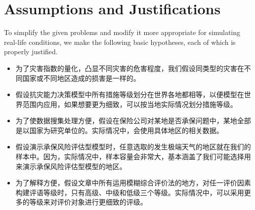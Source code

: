 \documentclass{mcmthesis}
\begin{document}
\section{Assumptions and Justifications}
 To simplify the given problems and modify it more appropriate for simulating real-life conditions, we make the following basic hypotheses, each of which is properly justified.
\begin{itemize}
	\item 为了灾害指数的量化，凸显不同灾害的危害程度，我们假设同类型的灾害在不同国家或不同地区造成的损害是一样的。
	\item 假设抗灾能力决策模型中所有措施等级划分在世界各地都相等，以便模型在世界范围内应用，如果想要更为细致，可以按当地实际情况划分措施等级。
	\item 为了使数据搜集处理方便，假设在保险公司对某地是否承保问题中，某地全部是以国家为研究单位的。实际情况中，会使用具体地区的相关数据。
	\item 假设演示承保风险评估型模型时，任意选取的发生极端天气的地区就在我们的样本中。因为，实际情况中，样本容量会非常大，基本涵盖了我们可能选择用来演示承保风险评估型模型的地区。
	\item 为了解释方便，假设文章中所有运用模糊综合评价法的地方，对任一评价因素构建评语等级时，只有高级、中级和低级三个等级。实际情况中，可以采用更多的等级来对评价对象进行更细致的评级。

\end{itemize}
\end{document}
